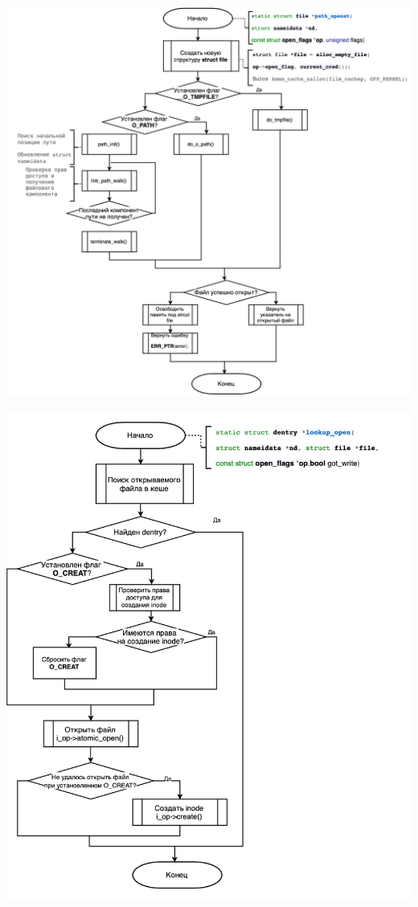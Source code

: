 \documentclass[12pt]{report}
\begin{document}
\begin{center}
		\includegraphics[scale=0.75]{pics/part5.png}
\end{center}

\begin{center}
		\includegraphics[scale=0.75]{pics/part6.png}
\end{center}
\end{document}
